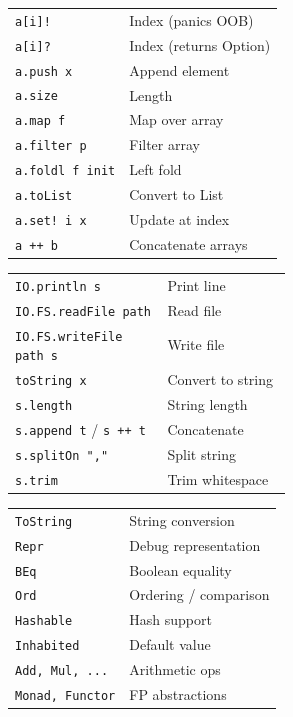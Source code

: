 \documentclass[10pt]{extarticle}
\begin{document}
\begin{multicols}{2}
\begin{tabularx}{\linewidth}{@{}l@{\enspace}Y@{}}
\texttt{a[i]!}                      & Index (panics OOB) \\
\texttt{a[i]?}                      & Index (returns Option) \\
\texttt{a.push x}                   & Append element \\
\texttt{a.size}                     & Length \\
\texttt{a.map f}                    & Map over array \\
\texttt{a.filter p}                 & Filter array \\
\texttt{a.foldl f init}             & Left fold \\
\texttt{a.toList}                   & Convert to List \\
\texttt{a.set! i x}                 & Update at index \\
\texttt{a ++ b}                     & Concatenate arrays \\
\end{tabularx}

\begin{tabularx}{\linewidth}{@{}>{\raggedright\arraybackslash}p{0.55\linewidth}@{\enspace}Y@{}}
\texttt{IO.println s}               & Print line \\
\texttt{IO.FS.readFile path}        & Read file \\
\texttt{IO.FS.writeFile path s}     & Write file \\
\texttt{toString x}                 & Convert to string \\
\texttt{s.length}                   & String length \\
\texttt{s.append t}  / \texttt{s ++ t}  & Concatenate \\
\texttt{s.splitOn ","}              & Split string \\
\texttt{s.trim}                     & Trim whitespace \\
\end{tabularx}

\begin{tabularx}{\linewidth}{@{}l@{\enspace}Y@{}}
\texttt{ToString}           & String conversion \\
\texttt{Repr}               & Debug representation \\
\texttt{BEq}                & Boolean equality \\
\texttt{Ord}                & Ordering / comparison \\
\texttt{Hashable}            & Hash support \\
\texttt{Inhabited}           & Default value \\
\texttt{Add, Mul, ...}       & Arithmetic ops \\
\texttt{Monad, Functor}      & FP abstractions \\
\end{tabularx}


\end{multicols}
\end{document}
